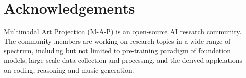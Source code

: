 

\section*{Acknowledgements}
Multimodal Art Projection (M-A-P) is an open-source AI research community.
The community members are working on research topics in a wide range of spectrum, including but not limited to pre-training paradigm of foundation models, large-scale data collection and processing, and the derived applciations on coding, reasoning and music generation.
